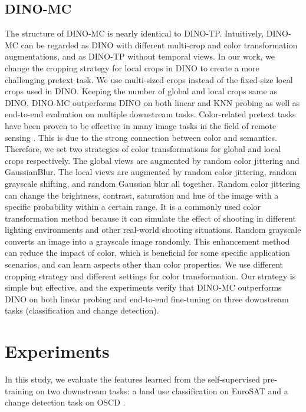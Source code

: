 \documentclass[10pt,twocolumn,letterpaper]{article}
\begin{document}
\subsection{DINO-MC}
\label{section:dino-mc}
The structure of DINO-MC is nearly identical to DINO-TP.
Intuitively, DINO-MC can be regarded as DINO with different multi-crop and color transformation augmentations, and as DINO-TP without temporal views.
In our work, we change the cropping strategy for local crops in DINO to create a more challenging pretext task.
We use multi-sized crops instead of the fixed-size local crops used in DINO. 
Keeping the number of global and local crops same as DINO, DINO-MC outperforms DINO on both linear and KNN probing as well as end-to-end evaluation on multiple downstream tasks.
Color-related pretext tasks have been proven to be effective in many image tasks in the field of remote sensing \cite{zhang2016colorful, vincenzi2021color, assran2022masked}.
This is due to the strong connection between color and semantics.
Therefore, we set two strategies of color transformations for global and local crops respectively.
The global views are augmented by random color jittering and GaussianBlur.
The local views are augmented by random color jittering, random grayscale shifting, and random Gaussian blur all together.
Random color jittering can change the brightness, contrast, saturation and hue of the image with a specific probability within a certain range.
It is a commonly used color transformation method because it can simulate the effect of shooting in different lighting environments and other real-world shooting situations.
Random grayscale converts an image into a grayscale image randomly.
This enhancement method can reduce the impact of color, which is beneficial for some specific application scenarios, and can learn aspects other than color properties.
We use different cropping strategy and different settings for color transformation.
Our strategy is simple but effective, and the experiments verify that DINO-MC outperforms DINO on both linear probing and end-to-end fine-tuning on three downstream tasks (classification and change detection).

\section{Experiments}
In this study, we evaluate the features learned from the self-supervised pre-training on two downstream tasks: a land use classification on EuroSAT \cite{helber2019eurosat} and a change detection task on OSCD \cite{daudt2018urban}.
\end{document}
